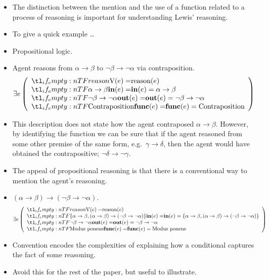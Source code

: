 \documentclass[10pt]{article}
\newcommand{\hozlinedash}[0]{%
  \noindent\hdashrule[0.5ex][c]{\textwidth}{.1pt}{2.5pt}
}
\begin{document}
\begin{itemize}
\item The distinction between the mention and the use of a function related to a process of reasoning is important for understanding Lewis' reasoning.
\item To give a quick example \dots
\item Propositional logic.
\item Agent reasons from \(\alpha \rightarrow \beta\) to \(\lnot \beta \rightarrow \lnot\alpha\) via contraposition.
      \[
    \exists e
    \left(
      \begin{array}{l}
        \everb{reason} \\
        \ein{\alpha \rightarrow \beta} \\
        \eout{\lnot \beta \rightarrow \lnot\alpha} \\
        \efunc{\text{Contraposition}}
      \end{array}
    \right)
  \]
\item This description does not state how the agent contraposed \(\alpha \rightarrow \beta\).
  However, by identifying the function we can be sure that if the agent reasoned from some other premise of the same form, e.g.\ \(\gamma \rightarrow \delta\), then the agent would have obtained the contrapositive; \(\lnot \delta \rightarrow \lnot \gamma\).
\item The appeal of propositional reasoning is that there is a conventional way to mention the agent's reasoning.
\item \((\alpha \rightarrow \beta) \rightarrow (\lnot \beta \rightarrow \lnot\alpha)\).
  \[
    \exists e
    \left(
      \begin{array}{l}
        \everb{reason} \\
        \ein{\{\alpha \rightarrow \beta, (\alpha \rightarrow \beta) \rightarrow (\lnot \beta \rightarrow \lnot\alpha)\}} \\
        \eout{\lnot \beta \rightarrow \lnot\alpha} \\
        \efunc{\text{Modus ponens}}
      \end{array}
    \right)
  \]
\item Convention encodes the complexities of explaining how a conditional captures the fact of some reasoning.
\item Avoid this for the rest of the paper, but useful to illustrate.
\end{itemize}

\hozlinedash
\end{document}
